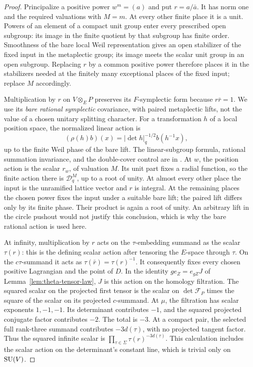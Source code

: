 \begin{proof}
Principalize a positive power \(w^m=(a)\) and put \(r=a/\bar a\).
It has norm one and the required valuations with \(M=m\).
At every other finite place it is a unit.  Powers of an element of
a compact unit group enter every prescribed open subgroup: its
image in the finite quotient by that subgroup has finite order.
Smoothness of the bare local Weil representation gives an open
stabilizer of the fixed input in the metaplectic group; its image
meets the scalar unit group in an open subgroup.
Replacing \(r\) by a common positive power therefore places it
in the stabilizers needed at the finitely many exceptional places
of the fixed input; replace \(M\) accordingly.

Multiplication by \(r\) on \(V\otimes_E P\) preserves its
\(F\)-symplectic form because \(r\bar r=1\).  We use its
\emph{bare rational symplectic} covariance, with paired
metaplectic lifts, not the value of a chosen unitary splitting
character.  For a transformation \(h\) of a local position space,
the normalized linear action is
\[
(\rho(h)b)(x)=|\det h|_q^{-1/2}b(h^{-1}x),
\]
up to the finite Weil phase of the bare lift.  The linear-subgroup
formula, rational summation invariance, and the double-cover
control are in
\cite[I, no.~13; III, no.~41; IV, nos.~43--45]{Weil1964}.
At \(w\), the position action is the scalar \(r_w\), of valuation
\(M\).  Its unit part fixes a radial function, so the finite
action there is \(\mathcal D_q^M\), up to a root of unity.
At almost every other place the input is the unramified lattice
vector and \(r\) is integral.  At the remaining places the
chosen power fixes the input under a suitable bare lift;
the paired lift differs only by its finite phase.  Their product
is again a root of unity.  An arbitrary lift in the circle
pushout would not justify this conclusion, which is why the bare
rational action is used here.

At infinity, multiplication by \(r\) acts on the \(\tau\)-embedding
summand as the scalar \(\tau(r)\): this is the defining scalar
action after tensoring the \(E\)-space through \(\tau\).
On the \(c\tau\)-summand it acts as
\(\tau(\bar r)=\tau(r)^{-1}\).  It consequently fixes every
chosen positive Lagrangian and the point of \(D\).  In the
identity \(g e_Z=e_{gZ}J\) of
Lemma~\ref{lem:theta-tensor-law}, \(J\) is this action on the
homology filtration.  The squared scalar on the projected first
tensor is the scalar on \(\det\mathcal F_P\) times the square of
the scalar on its projected \(c\)-summand.
At \(\mu\), the filtration has scalar exponents \(1,-1,-1\).
Its determinant contributes \(-1\), and the squared projected
conjugate factor contributes \(-2\).  The total is \(-3\).
At a compact pair, the selected full rank-three summand
contributes \(-3d(\tau)\), with no projected tangent factor.
Thus the squared infinite scalar is
\(\prod_{\tau\in\Sigma}\tau(r)^{-3d(\tau)}\).
This calculation includes the scalar action on the determinant's
constant line, which is trivial only on \(\operatorname{SU}(V)\).


\end{proof}
